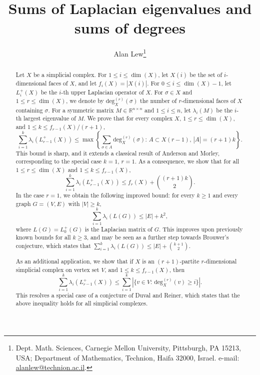 \documentclass[a4paper,11pt]{article}
\theoremstyle{plain}
\theoremstyle{definition}
\numberwithin{theorem}{section}
\numberwithin{equation}{section}
\begin{document}
\title{Sums of Laplacian eigenvalues and sums of degrees}

    \author{Alan Lew\thanks{Dept. Math. Sciences, Carnegie Mellon University, Pittsburgh, PA 15213, USA; 
    Department of Mathematics, Technion, Haifa 32000, Israel. \quad e-mail: \href{mailto:alanlew@technion.ac.il}{alanlew@technion.ac.il}.}}
  
	\date{}
	\maketitle

\begin{abstract}
Let $X$ be a simplicial complex. For $1\le i\le\dim(X)$, let $X(i)$ be the set of $i$-dimensional faces of $X$, and let $f_i(X)=|X(i)|$. For $0\le i\le \dim(X)-1$, let $L_i^+(X)$ be the $i$-th upper Laplacian operator of $X$. For $\sigma\in X$ and $1\le r\le \dim(X)$, we denote by $\text{deg}_X^{(r)}(\sigma)$ the number of $r$-dimensional faces of $X$ containing $\sigma$. For a symmetric matrix $M\in \mathbb{R}^{n\times n}$ and $1\le i\le n$, let $\lambda_i(M)$ be the $i$-th largest eigenvalue of $M$. We prove that for every complex $X$, $1\le r\le\dim(X)$, and $1\le k\le f_{r-1}(X)/(r+1)$,
\[ \sum_{i=1}^k \lambda_i(L_{r-1}^+(X)) \le \max \left\{ \sum_{\sigma\in A} \text{deg}_X^{(r)}(\sigma) :\, A\subset X(r-1),\, |A|=(r+1)k \right\}.
\]
This bound is sharp, and it extends a classical result of Anderson and Morley, corresponding to the special case $k=1,\, r=1$. As a consequence, we show that for all $1\le r\le \dim(X)$ and $1\le k\le f_{r-1}(X)$, \[ \sum_{i=1}^{k} \lambda_i(L_{r-1}^+(X)) \le f_r(X) + \binom{(r+1)k}{2}. \] In the case $r=1$, we obtain the following improved bound: for every $k\ge 1$ and every graph $G=(V,E)$ with $|V|\ge k$,
\[
  \sum_{i=1}^k \lambda_i(L(G)) \leq |E|+k^2,
\]
where $L(G)=L_0^{+}(G)$ is the Laplacian matrix of $G$. This improves upon previously known bounds for all $k\ge 3$, and may be seen as a further step towards Brouwer's conjecture, which states that $\sum_{i=1}^k \lambda_i(L(G)) \leq |E|+\binom{k+1}{2}$.

As an additional application, we show that if $X$ is an $(r+1)$-partite $r$-dimensional simplicial complex on vertex set $V$, and $1\le k\le f_{r-1}(X)$, then 
\[
  \sum_{i=1}^{k} \lambda_i(L_{r-1}^+(X)) \le \sum_{i=1}^k \left|\{v\in V:\, \text{deg}^{(r)}_X(v)\ge i\}\right|.
\]
This resolves a special case of a conjecture of Duval and Reiner, which states that the above inequality holds for all simplicial complexes.
\end{abstract}
\end{document}
